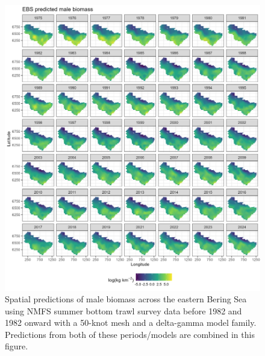 \documentclass[
]{article}
\begin{document}
\begin{figure}

{\centering \includegraphics[width=1\linewidth,height=1\textheight]{../BAIRDI/Figures/EBS_male_spatbio} 

}

\caption{Spatial predictions of male biomass across the eastern Bering Sea using NMFS summer bottom trawl survey data before 1982 and 1982 onward with a 50-knot mesh and a delta-gamma model family. Predictions from both of these periods/models are combined in this figure.}\label{fig:spatpred-bio-50-male}
\end{figure}
\end{document}
